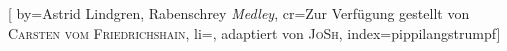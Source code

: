 

[%
    by={Astrid Lindgren, Rabenschrey \textit{Medley}},
    cr={Zur Verf\"{u}gung gestellt von \textsc{Carsten vom Friedrichshain}},
    li={, adaptiert von \textsc{JoSh}},
    index={pippilangstrumpf}]


    \label{pippilangstrumpf}

    \begin{center}
    \end{center}

